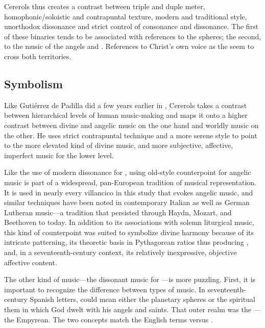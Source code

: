 Cererols thus creates a contrast between triple and duple meter,
homophonic/soloistic and contrapuntal texture, modern and traditional style,
unorthodox dissonance and strict control of consonance and dissonance.
The first of these binaries tends to be associated with references to the
spheres; the second, to the music of the angels and . 
References to Christ's own voice as the  seem to cross both
territories.

\subsection{Symbolism}

Like Gutiérrez de Padilla did a few years earlier in , Cererols takes a contrast between hierarchical levels of human
music-making and maps it onto a higher contrast between divine and angelic music
on the one hand and worldly music on the other.
He uses strict contrapuntal technique and a more serene style to point to the
more elevated kind of divine music, and more subjective, affective,
imperfect music for the lower level.

Like the use of modern dissonance for , using old-style
counterpoint for angelic music is part of a widespread, pan-European tradition
of musical representation. 
It is used in nearly every villancico in this study that evokes angelic music,
and similar techniques have been noted in contemporary Italian as well as German
Lutheran music---a tradition that persisted through Haydn, Mozart, and Beethoven
to today.%
In addition to its associations with solemn liturgical music, this kind of
counterpoint was suited to symbolize divine harmony because of its intricate
patterning, its theoretic basis in Pythagorean ratios thus producing
, and, in a seventeenth-century context, its relatively
inexpressive, objective affective content.

The other kind of music---the dissonant music for ---is more puzzling.
First, it is important to recognize the difference between types of
 music.
In seventeenth-century Spanish letters,  could mean either the
planetary spheres or the spiritual  them in which God dwelt
with his angels and saints.
That outer realm was the ---the Empyrean.
The two concepts match the English terms  versus
.

